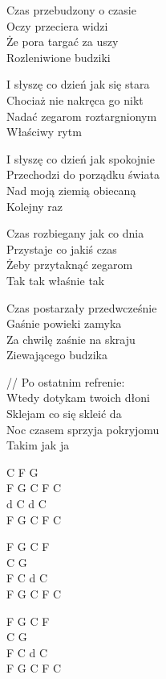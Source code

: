 \begin{text}    
    Czas przebudzony o czasie\\   
    Oczy przeciera widzi \\   
    Że pora targać za uszy\\           
    Rozleniwione budziki
	
    \vin I słyszę co dzień jak się stara\\  
    \vin Chociaż nie nakręca go nikt\\      
    \vin Nadać zegarom roztargnionym\\     
    \vin Właściwy rytm          
          
    \vin I słyszę co dzień jak spokojnie\\
    \vin Przechodzi do porządku świata\\
    \vin Nad moją ziemią obiecaną\\
    \vin Kolejny raz

    Czas rozbiegany jak co dnia\\
    Przystaje co jakiś czas\\
    Żeby przytaknąć zegarom\\
    Tak tak właśnie tak
	
    Czas postarzały przedwcześnie\\
    Gaśnie powieki zamyka\\
    Za chwilę zaśnie na skraju\\
    Ziewającego budzika	
	
    \vin // Po ostatnim refrenie:\\
    \vin Wtedy dotykam twoich dłoni\\
    \vin Sklejam co się skleić da\\
    \vin Noc czasem sprzyja pokryjomu\\
    \vin Takim jak ja	
\end{text}
\begin{chord}
    C F G\\
    F G C F C\\
    d C d C\\
    F G C F C
	
    F G C F\\
    C G\\
    F C d C\\
    F G C F C

    F G C F\\
    C G\\
    F C d C\\
    F G C F C
\end{chord}